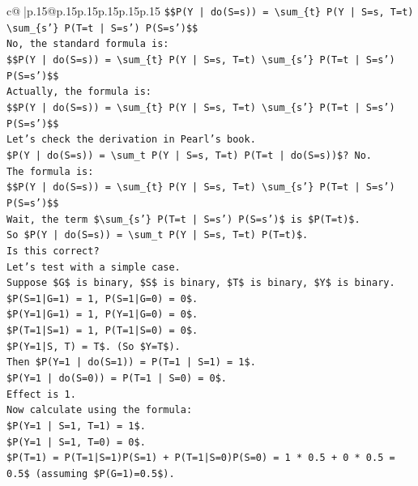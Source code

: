\documentclass{article}
\begin{document}
{\begin{supertabular}{c@{$\;$}|p{.15\linewidth}@{}p{.15\linewidth}p{.15\linewidth}p{.15\linewidth}p{.15\linewidth}p{.15\linewidth}}
{{{\texttt{\$\$P(Y | do(S=s)) = \textbackslash{}sum\_\{t\} P(Y | S=s, T=t) \textbackslash{}sum\_\{s'\} P(T=t | S=s') P(S=s')\$\$} \\
\texttt{No, the standard formula is:} \\
\texttt{\$\$P(Y | do(S=s)) = \textbackslash{}sum\_\{t\} P(Y | S=s, T=t) \textbackslash{}sum\_\{s'\} P(T=t | S=s') P(S=s')\$\$} \\
\texttt{Actually, the formula is:} \\
\texttt{\$\$P(Y | do(S=s)) = \textbackslash{}sum\_\{t\} P(Y | S=s, T=t) \textbackslash{}sum\_\{s'\} P(T=t | S=s') P(S=s')\$\$} \\
\texttt{Let's check the derivation in Pearl's book.} \\
\texttt{\$P(Y | do(S=s)) = \textbackslash{}sum\_t P(Y | S=s, T=t) P(T=t | do(S=s))\$? No.} \\
\texttt{The formula is:} \\
\texttt{\$\$P(Y | do(S=s)) = \textbackslash{}sum\_\{t\} P(Y | S=s, T=t) \textbackslash{}sum\_\{s'\} P(T=t | S=s') P(S=s')\$\$} \\
\texttt{Wait, the term \$\textbackslash{}sum\_\{s'\} P(T=t | S=s') P(S=s')\$ is \$P(T=t)\$.} \\
\texttt{So \$P(Y | do(S=s)) = \textbackslash{}sum\_t P(Y | S=s, T=t) P(T=t)\$.} \\
\texttt{Is this correct?} \\
\texttt{Let's test with a simple case.} \\
\texttt{Suppose \$G\$ is binary, \$S\$ is binary, \$T\$ is binary, \$Y\$ is binary.} \\
\texttt{\$P(S=1|G=1) = 1, P(S=1|G=0) = 0\$.} \\
\texttt{\$P(Y=1|G=1) = 1, P(Y=1|G=0) = 0\$.} \\
\texttt{\$P(T=1|S=1) = 1, P(T=1|S=0) = 0\$.} \\
\texttt{\$P(Y=1|S, T) = T\$. (So \$Y=T\$).} \\
\texttt{Then \$P(Y=1 | do(S=1)) = P(T=1 | S=1) = 1\$.} \\
\texttt{\$P(Y=1 | do(S=0)) = P(T=1 | S=0) = 0\$.} \\
\texttt{Effect is 1.} \\
\texttt{Now calculate using the formula:} \\
\texttt{\$P(Y=1 | S=1, T=1) = 1\$.} \\
\texttt{\$P(Y=1 | S=1, T=0) = 0\$.} \\
\texttt{\$P(T=1) = P(T=1|S=1)P(S=1) + P(T=1|S=0)P(S=0) = 1 * 0.5 + 0 * 0.5 = 0.5\$ (assuming \$P(G=1)=0.5\$).} \\
}}}
\end{supertabular}}
\end{document}

